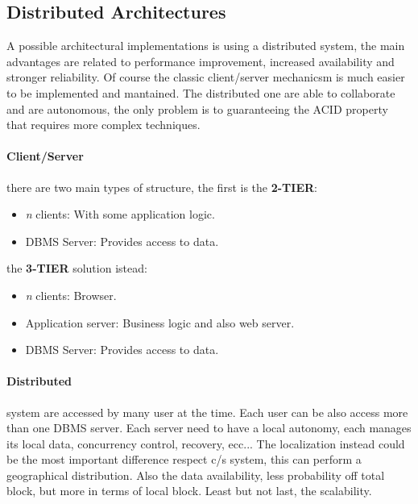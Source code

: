 \documentclass[12pt]{article}
\begin{document}
\subsection{Distributed Architectures}
A possible architectural implementations is using a distributed system, the main advantages are related to performance improvement, increased availability and stronger reliability. Of course the classic client/server mechanicsm is much easier to be implemented and mantained. The distributed one are able to collaborate and are autonomous, the only problem is to guaranteeing the ACID property that requires more complex techniques.\\
\paragraph{Client/Server} there are two main types of structure, the first is the \textbf{2-TIER}:
\begin{itemize}
  \item \textit{n} clients: With some application logic.
  \item DBMS Server: Provides access to data.
\end{itemize}
the \textbf{3-TIER} solution istead:
\begin{itemize}
  \item \textit{n} clients: Browser.
  \item Application server: Business logic and also web server.
  \item DBMS Server: Provides access to data.
\end{itemize}

\paragraph{Distributed} system are accessed by many user at the time. Each user can be also access more than one DBMS server. Each server need to have a local autonomy, each manages its local data, concurrency control, recovery, ecc... The localization instead could be the most important difference respect c/s system, this can perform a geographical distribution. Also the data availability, less probability off total block, but more in terms of local block. Least but not last, the scalability.
\end{document}
